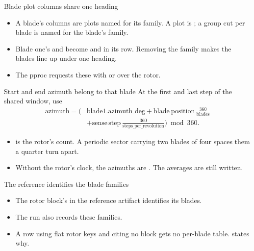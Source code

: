 \begin{frame}{Blade plot columns share one heading}
\begin{itemize}\small
  \item A blade's columns are plots named for its family.
        A plot is ; a group cut per blade is
        named for the blade's family.
  \item Blade one's  and 
        become  and  in its row.
        Removing the family makes the blades line up under one heading.
  \item The pproc requests these with  or
         over the rotor.
\end{itemize}
\end{frame}

\begin{frame}{Start and end azimuth belong to that blade}
\small At the first and last step of the shared window, use
\[
\begin{split}
\mathrm{azimuth}=\biggl(&\mathrm{blade1.azimuth\_deg}
 +\mathrm{blade\ position}\,\frac{360}{\mathrm{blades}}\\
 &+\mathrm{sense}\,\mathrm{step}\,
 \frac{360}{\mathrm{steps\_per\_revolution}}\biggr)\bmod 360.
\end{split}
\]
\begin{itemize}
  \item {} is the rotor's count. A periodic sector carrying
        two blades of four spaces them a quarter turn apart.
  \item Without the rotor's clock, the azimuths are .
        The averages are still written.
\end{itemize}
\end{frame}

\begin{frame}{The reference identifies the blade families}
\begin{itemize}
  \item The rotor block's  in the reference artifact
        identifies its blades.
  \item The run also records these families.
  \item A row using flat rotor keys and citing no block gets no per-blade
        table.  states why.
\end{itemize}
\end{frame}
